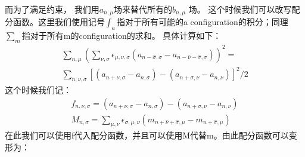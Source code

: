 \documentclass{article}
\begin{document}
而为了满足约束，
我们用$a_{n,\mu}$场来替代所有的$b_{n,\mu}$ 场。
这个时候我们可以改写配分函数。这里我们使用记号$\int_{a}$指对于所有可能的a configuration的积分；同理$\sum_{m}$指对于所有m的configuration的求和。
具体计算如下：
\begin{equation}
    \begin{split}
        \sum_{n,\mu}\left( \sum_{\nu,\sigma} \epsilon_{\mu,\nu,\sigma}\left( a_{n-\hat \sigma,\sigma} - a_{n-\hat \nu - \hat \sigma,\sigma}\right)   \right)^2 = \\
        \sum_{n,\nu,\sigma}\left[ \left(a_{n+\nu,\sigma}-a_{n,\sigma} \right) - \left( a_{n+\sigma,\nu} - a_{n,\nu} \right)   \right]^2 /2  
    \end{split}
\end{equation}
这个时候我们记：
\begin{equation}
    \begin{split}
        f_{n,\nu,\sigma} =\left( a_{n+\nu,\sigma}-a_{n,\sigma} \right) - \left( a_{n+\sigma,\nu} - a_{n,\nu} \right) \\
        M_{n,\sigma} = \sum_{\mu,\nu} \epsilon_{\sigma,\mu,\nu} \left( m_{n+\hat \nu + \hat \sigma,\mu} - m_{n+\hat \sigma , \mu} \right) 
    \end{split}
\end{equation}
在此我们可以使用f代入配分函数，并且可以使用M代替m。由此配分函数可以变形为：
\end{document}
